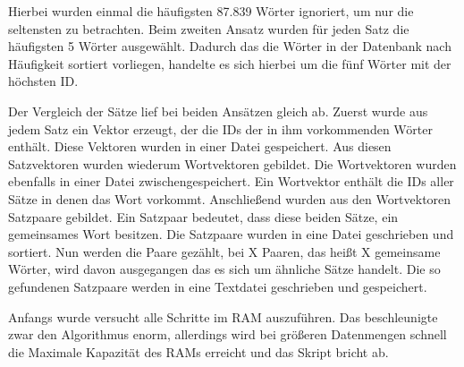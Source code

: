 \documentclass[a4paper,11pt,utf8]{scrartcl}
\begin{document}
Hierbei wurden einmal die häufigsten 87.839 Wörter ignoriert, um nur die seltensten zu betrachten. Beim zweiten Ansatz wurden für jeden Satz die häufigsten 5 Wörter ausgewählt. Dadurch das die Wörter in der Datenbank nach Häufigkeit sortiert vorliegen, handelte es sich hierbei um die fünf Wörter mit der höchsten ID.

Der Vergleich der Sätze lief bei beiden Ansätzen gleich ab. Zuerst wurde aus jedem Satz ein Vektor erzeugt, der die IDs der in ihm vorkommenden Wörter enthält. Diese Vektoren wurden in einer Datei gespeichert. Aus diesen Satzvektoren wurden wiederum Wortvektoren gebildet. Die Wortvektoren wurden ebenfalls in einer Datei zwischengespeichert. Ein Wortvektor enthält die IDs aller Sätze in denen das Wort vorkommt. Anschließend wurden aus den Wortvektoren Satzpaare gebildet. Ein Satzpaar bedeutet, dass diese beiden Sätze, ein gemeinsames Wort besitzen. Die Satzpaare wurden in eine Datei geschrieben und sortiert. Nun werden die Paare gezählt, bei X Paaren, das heißt X gemeinsame Wörter, wird davon ausgegangen das es sich um ähnliche Sätze handelt. Die so gefundenen Satzpaare werden in eine Textdatei geschrieben und gespeichert. 

Anfangs wurde versucht alle Schritte im RAM auszuführen. Das beschleunigte zwar den Algorithmus enorm, allerdings wird bei größeren Datenmengen schnell die Maximale Kapazität des RAMs erreicht und das Skript bricht ab. 
\end{document}
